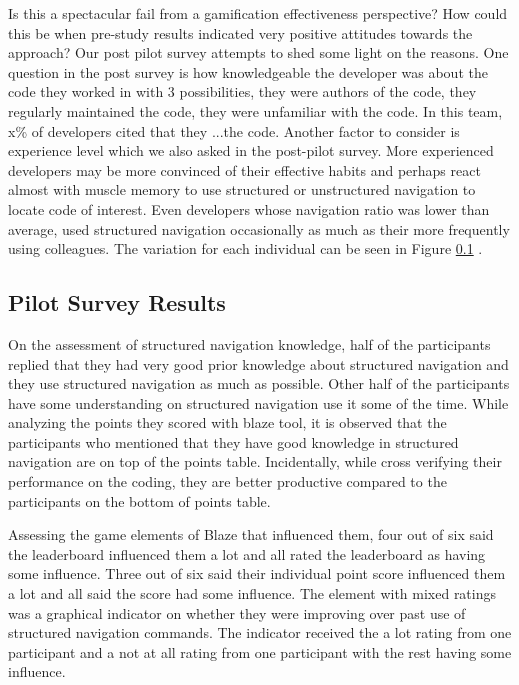 \documentclass{sig-alternate}
\begin{document}
Is this a spectacular fail from a gamification effectiveness perspective?   How could this be when pre-study results indicated very positive attitudes towards the approach?  Our post pilot survey attempts to shed some light on the reasons.  One question in the post survey is how knowledgeable the developer was about the code they worked in with 3 possibilities,  they were authors of the code, they regularly maintained the code, they were unfamiliar with the code.  In this team, x\% of developers cited that they ...the code.  Another factor to consider is experience level which we also asked in the post-pilot survey.  More experienced developers may be more convinced of their effective habits and perhaps react almost with muscle memory to use structured or unstructured navigation to locate code of interest.  Even developers whose navigation ratio  was lower than average, used structured navigation occasionally as much as their more frequently using colleagues.  The variation for each individual can be seen in Figure \ref{} .

\subsection{Pilot Survey Results}

On the assessment of structured navigation knowledge, half of the participants replied that they had very good prior knowledge about structured navigation and they use structured navigation as much as possible.  Other half of the participants have some understanding on structured navigation use it some of the time. While analyzing the points they scored with blaze tool, it is observed that the participants who mentioned that they have good knowledge in structured navigation are on top of the points table. 
Incidentally, while cross verifying their performance on the coding, they are better productive compared to the participants on the bottom of points table.

Assessing the game elements of Blaze that influenced them, four out of six said the leaderboard influenced them a lot and all rated the leaderboard as having some influence.  Three out of six  said their individual point score influenced them a lot and all said the score had some influence.  The element with mixed ratings was a graphical indicator on whether they were improving over past use of structured navigation commands.  The indicator received the a lot rating from one participant and a not at all rating from one participant with the rest having some influence.
\end{document}
